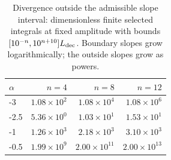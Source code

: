 \begin{table}[H]\centering\small
\renewcommand{\arraystretch}{1.15}
\caption{Divergence outside the admissible slope interval: dimensionless finite selected integrals at fixed amplitude with bounds $[10^{-n},10^{n+10}]L_{\rm dec}$. Boundary slopes grow logarithmically; the outside slopes grow as powers.}
\begin{tabular}{@{}lrrr@{}}
\toprule
$\alpha$ & $n=4$ & $n=8$ & $n=12$ \\\midrule
-3 & $1.08\times10^{2}$ & $1.08\times10^{4}$ & $1.08\times10^{6}$ \\
-2.5 & $5.36\times10^{0}$ & $1.03\times10^{1}$ & $1.53\times10^{1}$ \\
-1 & $1.26\times10^{3}$ & $2.18\times10^{3}$ & $3.10\times10^{3}$ \\
-0.5 & $1.99\times10^{9}$ & $2.00\times10^{11}$ & $2.00\times10^{13}$ \\
\bottomrule\end{tabular}\end{table}

